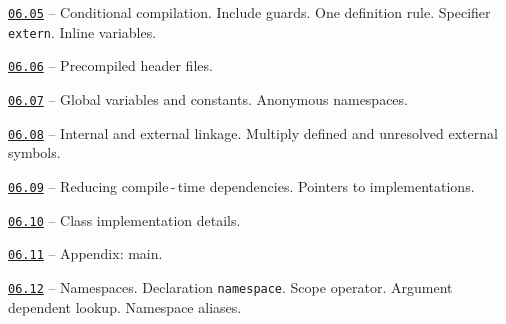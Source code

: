 \documentclass[a4paper,12pt]{article}
\renewenvironment{itemize}
{
    \begin{list}{\labelitemi}
    {
      \setlength{\topsep}{0pt}
      \setlength{\partopsep}{0pt}
      \setlength{\parskip}{0pt}
      \setlength{\itemsep}{0pt}
      \setlength{\parsep}{0pt}
      \setlength{\leftmargin}{14.5pt}
    }
}{\end{list}}
\begin{document}
\medskip\smallskip

\begin{itemize}

    \item \href{https://github.com/i-s-m-mipt/Education/blob/master/projects/examples/source/06.05.hpp}{\texttt{06.05}} -- Conditional compilation. Include guards. One definition rule. Specifier \lstinline{extern}. Inline variables.

    \smallskip

    \item \href{https://github.com/i-s-m-mipt/Education/blob/master/projects/examples/source/06.06.hpp}{\texttt{06.06}} -- Precompiled header files.

    \smallskip

    \item \href{https://github.com/i-s-m-mipt/Education/blob/master/projects/examples/source/06.07.cpp}{\texttt{06.07}} -- Global variables and constants. Anonymous namespaces.

    \smallskip

    \item \href{https://github.com/i-s-m-mipt/Education/blob/master/projects/examples/source/06.08.cpp}{\texttt{06.08}} -- Internal and external linkage. Multiply defined and unresolved external symbols.

    \smallskip

    \item \href{https://github.com/i-s-m-mipt/Education/blob/master/projects/examples/source/06.09.hpp}{\texttt{06.09}} -- Reducing compile\,-\,time dependencies. Pointers to implementations.

    \smallskip

    \item \href{https://github.com/i-s-m-mipt/Education/blob/master/projects/examples/source/06.10.cpp}{\texttt{06.10}} -- Class implementation details.

    \smallskip

    \item \href{https://github.com/i-s-m-mipt/Education/blob/master/projects/examples/source/06.11.cpp}{\texttt{06.11}} -- Appendix: main.

    \smallskip

    \item \href{https://github.com/i-s-m-mipt/Education/blob/master/projects/examples/source/06.12.cpp}{\texttt{06.12}} -- Namespaces. Declaration \lstinline{namespace}. Scope operator. Argument dependent lookup. Namespace aliases.

\end{itemize}
\end{document}

